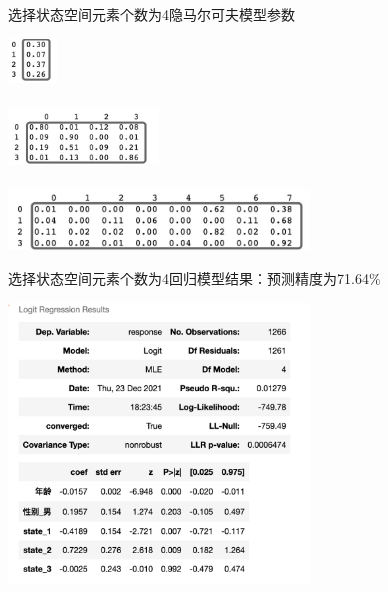\documentclass{beamer}
\begin{document}
\begin{frame}{选择状态空间元素个数为4}{隐马尔可夫模型参数}
    \begin{center}
    \includegraphics[width=0.1\textwidth]{初始分布4.jpeg}\\
    \\
    \includegraphics[width=0.3\textwidth]{转移概率矩阵4.jpeg}\\
    \\
    \includegraphics[width=0.6\textwidth]{输出概率矩阵4.jpeg}\\
    \end{center}
\end{frame}

\begin{frame}{选择状态空间元素个数为4}{回归模型结果：预测精度为71.64\%}
    \begin{center}
\includegraphics[width=0.6\textwidth]{LR_4.png}\\
    \end{center}
\end{frame}
\end{document}
